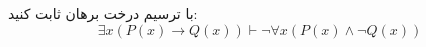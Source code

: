 با ترسیم درخت برهان ثابت کنید:
$$\exists x (P(x)\to Q(x))\vdash \neg\forall x(P(x)\wedge \neg Q(x))$$